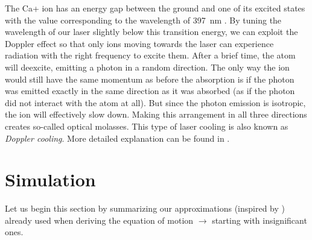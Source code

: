The Ca+ ion has an energy gap between the ground and one of its excited states with the value corresponding to the wavelength of \SI{397}{\nano\meter} \cite{urabe1993laser}. By tuning the wavelength of our laser slightly below this transition energy, we can exploit the Doppler effect so that only ions moving towards the laser can experience radiation with the right frequency to excite them. After a brief time, the atom will deexcite, emitting a photon in a random direction. The only way the ion would still have the same momentum as before the absorption is if the photon was emitted exactly in the same direction  as it was absorbed (as if the photon did not interact with the atom at all). But since the photon emission is isotropic, the ion will effectively slow down. Making this arrangement in all three directions creates so-called optical molasses. This type of laser cooling is also known as \emph{Doppler cooling}. More detailed explanation can be found in \cite{alma990008711500106986}.  
 
	
\section{Simulation}
\label{simulation}

Let us begin this section by summarizing our approximations (inspired by \cite{Friedman_1982}) already used when deriving the equation of motion $\rightarrow$ starting with insignificant ones. 

